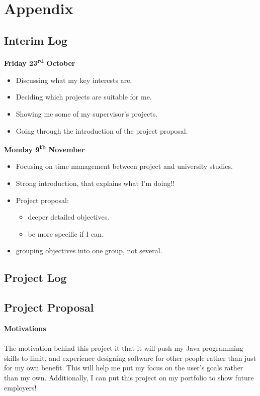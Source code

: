 \documentclass[a4paper, 12pt]{article}
\begin{document}
    \clearpage
    \section{Appendix}
        \subsection{Interim Log}
            \textbf{Friday 23\textsuperscript{rd} October}
                \begin{itemize}
                    \item Discussing what my key interests are.
                    \item Deciding which projects are suitable for me.
                    \item Showing me some of my supervisor's projects. 
                    \item Going through the introduction of the project proposal. \\
                \end{itemize}
            \textbf{Monday 9\textsuperscript{th} November} 
                \begin{itemize}
                    \item Focusing on time management between project and university
                    studies.
                    \item Strong introduction, that explains what I'm doing!!
                    \item Project proposal:
                    \begin{itemize}
                        \item deeper detailed objectives.
                        \item be more specific if I can.
                    \end{itemize}
                    \item grouping objectives into one group, not several.
                \end{itemize}

    \clearpage
        \subsection{Project Log}
            \textbf{}

        \clearpage
        \subsection{Project Proposal}
            \textbf{Motivations} \\\\    
            The motivation behind this project it that it will push my Java programming
            skills to limit, and experience designing software for other people rather
            than just for my own benefit. This will help me put my focus on the user's
            goals rather than my own. Additionally, I can put this project on my portfolio
            to show future employers!
\end{document}
